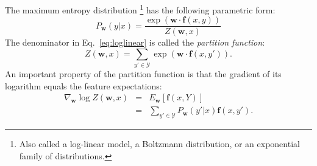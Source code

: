 The maximum entropy distribution%
\footnote{Also called a log-linear model, a Boltzmann distribution, or an exponential family of 
distributions.} %
has the following parametric form: 
\begin{equation}\label{eq:loglinear}
P_{\boldsymbol{w}}(y|x) = \frac{\exp(\boldsymbol{w} \cdot \boldsymbol{f}(x,y))}{Z(\boldsymbol{w},x)}
\end{equation}
The denominator in Eq.~\ref{eq:loglinear} is called the \emph{partition function}:
\begin{equation}
Z(\boldsymbol{w},x) = \sum_{y' \in \mathcal{Y}} \exp(\boldsymbol{w} \cdot \boldsymbol{f}(x,y')).
\end{equation}
An important property of the partition function is that the gradient of its logarithm equals 
the feature expectations: 
\begin{eqnarray}
\nabla_{\boldsymbol{w}} \log Z(\boldsymbol{w},x) &=& E_{\boldsymbol{w}} [\boldsymbol{f}(x,Y)]\nonumber\\
&=& \sum_{y' \in \mathcal{Y}} P_{\boldsymbol{w}}(y'|x) \boldsymbol{f}(x,y').
\end{eqnarray}

